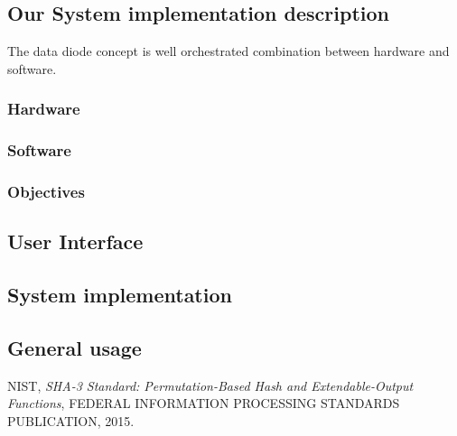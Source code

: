 \documentclass[a4paper,10pt]{article}
\begin{document}
\subsection{Our System implementation description}
The data diode concept is well orchestrated combination between hardware and software.
\subsubsection{Hardware}
\subsubsection{Software}
\subsubsection{Objectives}
\subsection{User Interface}
\subsection{System implementation}
\subsection{General usage}


\begin{thebibliography}{9}

NIST,
\textit{SHA-3 Standard: Permutation-Based Hash and Extendable-Output Functions},
FEDERAL INFORMATION PROCESSING STANDARDS PUBLICATION,
2015.

\end{thebibliography}
\end{document}
